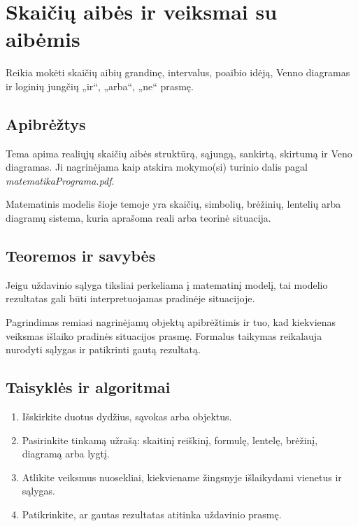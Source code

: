 \section{Skaičių aibės ir veiksmai su aibėmis}\label{sec:skaiciu-aibes-ir-veiksmai-su-aibemis}

\begin{tcolorbox}[title=Prieš pradedant, colback=green!5]
Reikia mokėti skaičių aibių grandinę, intervalus, poaibio idėją, Venno diagramas ir loginių jungčių „ir“, „arba“, „ne“ prasmę.
\end{tcolorbox}
\subsection{Apibrėžtys}
\begin{apibreztis}
Tema apima realiųjų skaičių aibės struktūrą, sąjungą, sankirtą, skirtumą ir Veno diagramas. Ji nagrinėjama kaip atskira mokymo(si) turinio dalis pagal \emph{matematikaPrograma.pdf}.
\end{apibreztis}
\begin{apibreztis}
Matematinis modelis šioje temoje yra skaičių, simbolių, brėžinių, lentelių arba diagramų sistema, kuria aprašoma reali arba teorinė situacija.
\end{apibreztis}

\subsection{Teoremos ir savybės}
\begin{savybe}
Jeigu uždavinio sąlyga tiksliai perkeliama į matematinį modelį, tai modelio rezultatas gali būti interpretuojamas pradinėje situacijoje.
\end{savybe}
\begin{pastaba}
Pagrindimas remiasi nagrinėjamų objektų apibrėžtimis ir tuo, kad kiekvienas veiksmas išlaiko pradinės situacijos prasmę. Formalus taikymas reikalauja nurodyti sąlygas ir patikrinti gautą rezultatą.
\end{pastaba}

\subsection{Taisyklės ir algoritmai}
\begin{enumerate}[label=\arabic*.]
\item Išskirkite duotus dydžius, sąvokas arba objektus.
\item Pasirinkite tinkamą užrašą: skaitinį reiškinį, formulę, lentelę, brėžinį, diagramą arba lygtį.
\item Atlikite veiksmus nuosekliai, kiekviename žingsnyje išlaikydami vienetus ir sąlygas.
\item Patikrinkite, ar gautas rezultatas atitinka uždavinio prasmę.
\end{enumerate}

